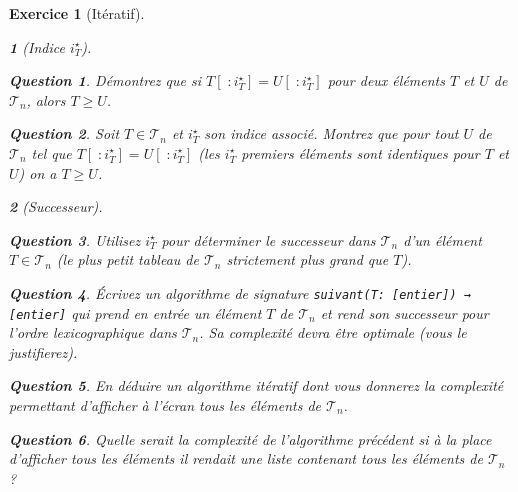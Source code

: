 \documentclass{article}
\theoremstyle{exostyle}
\newtheorem{exo}{Exercice}
\theoremstyle{partiestyle}
\newtheorem{partie}{}[exo]
\theoremstyle{questionstyle}
\newtheorem{questionpartie}{Question}[partie]
\begin{document}
\begin{exo}[Itératif]
\begin{partie}[Indice $i^\star_{T}$]
        \begin{questionpartie}
            Démontrez que si $T[\;:i^\star_{T}] = U[\;:i^\star_{T}]$ pour deux éléments $T$ et $U$ de $\mathcal{T}_n$, alors $T \geq U$.
        \end{questionpartie}
        \begin{questionpartie}
            Soit $T \in \mathcal{T}_n$ et $i^\star_{T}$ son indice associé. Montrez que pour tout $U$ de $\mathcal{T}_n$ tel 
            que $T[\;:i^\star_{T}] = U[\;:i^\star_{T}]$ (les $i^\star_{T}$ premiers éléments sont identiques pour $T$ et $U$) on a $T \geq U$.
        \end{questionpartie}
    \end{partie}
    \begin{partie}[Successeur]
        \begin{questionpartie}
            Utilisez $i^\star_{T}$ pour déterminer le successeur dans $\mathcal{T}_n$ d'un élément $T \in \mathcal{T}_n$ (le plus petit tableau de $\mathcal{T}_n$ strictement plus grand que $T$).
        \end{questionpartie}
        \begin{questionpartie}
            Écrivez un algorithme de signature \verb|suivant(T: [entier]) → [entier]|  qui prend en entrée un élément $T$ de $\mathcal{T}_n$ et rend son successeur pour l'ordre lexicographique dans $\mathcal{T}_n$. Sa complexité devra être optimale (vous le justifierez).
        \end{questionpartie}
        \begin{questionpartie}
            En déduire un algorithme itératif dont vous donnerez la complexité permettant d'afficher à l'écran tous les éléments de $\mathcal{T}_n$.
        \end{questionpartie}
        \begin{questionpartie}
            Quelle serait la complexité de l'algorithme précédent si à la place d'afficher tous les éléments il rendait une liste contenant tous les éléments de $\mathcal{T}_n$ ?
        \end{questionpartie}

    \end{partie}
\end{exo}
\end{document}
